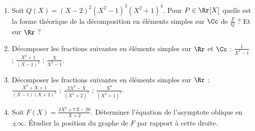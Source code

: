 \documentclass[class=report,crop=false]{standalone}
\begin{document}

\begin{miniexercices}
\sauteligne
\begin{enumerate}
  \item Soit $Q(X)=(X-2)^2(X^2-1)^3(X^2+1)^4$. Pour $P \in \Rr[X]$ quelle est la forme théorique
de la décomposition en éléments simples sur $\Cc$ de $\frac PQ$ ? Et sur $\Rr$ ?

  \item Décomposer les fractions suivantes en éléments simples sur $\Rr$ et $\Cc$ :
$\frac{1}{X^2-1}$ ; $\frac{X^2+1}{(X-1)^2}$ ; $\frac{X}{X^3-1}$.

  \item Décomposer les fractions suivantes en éléments simples sur $\Rr$ :
$\frac{X^2+X+1}{(X-1)(X+2)^2}$ ; $\frac{2X^2-X}{(X^2+2)^2}$ ; $\frac{X^6}{(X^2+1)^2}$.

  \item Soit $F(X) = \frac{2X^2+7X-20}{X+2}$.
  Déterminer l'équation de l'asymptote oblique en $\pm \infty$.
  \'Etudier la position du graphe de $F$ par rapport à cette droite.

\end{enumerate}
\end{miniexercices}



\finchapitre
\end{document}
